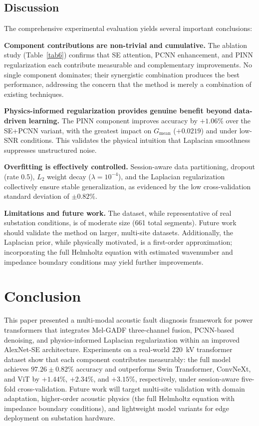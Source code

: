 \documentclass[twocolumn,iicol,pdflatex,sn-mathphys-num]{sn-jnl}%
\begin{document}
\subsection{Discussion}
The comprehensive experimental evaluation yields several important conclusions:

\textbf{Component contributions are non-trivial and cumulative.} The ablation study (Table~\ref{tab6}) confirms that SE attention, PCNN enhancement, and PINN regularization each contribute measurable and complementary improvements. No single component dominates; their synergistic combination produces the best performance, addressing the concern that the method is merely a combination of existing techniques.

\textbf{Physics-informed regularization provides genuine benefit beyond data-driven learning.} The PINN component improves accuracy by $+1.06\%$ over the SE+PCNN variant, with the greatest impact on $G_{\text{mean}}$ ($+0.0219$) and under low-SNR conditions. This validates the physical intuition that Laplacian smoothness suppresses unstructured noise.

\textbf{Overfitting is effectively controlled.} Session-aware data partitioning, dropout (rate 0.5), $L_2$ weight decay ($\lambda = 10^{-4}$), and the Laplacian regularization collectively ensure stable generalization, as evidenced by the low cross-validation standard deviation of $\pm 0.82\%$.

\textbf{Limitations and future work.} The dataset, while representative of real substation conditions, is of moderate size (661 total segments). Future work should validate the method on larger, multi-site datasets. Additionally, the Laplacian prior, while physically motivated, is a first-order approximation; incorporating the full Helmholtz equation with estimated wavenumber and impedance boundary conditions may yield further improvements.

\section{Conclusion}
\label{section6}
This paper presented a multi-modal acoustic fault diagnosis framework for power transformers that integrates Mel-GADF three-channel fusion, PCNN-based denoising, and physics-informed Laplacian regularization within an improved AlexNet-SE architecture. Experiments on a real-world 220~kV transformer dataset show that each component contributes measurably: the full model achieves $97.26 \pm 0.82\%$ accuracy and outperforms Swin Transformer, ConvNeXt, and ViT by $+1.44\%$, $+2.34\%$, and $+3.15\%$, respectively, under session-aware five-fold cross-validation. Future work will target multi-site validation with domain adaptation, higher-order acoustic physics (the full Helmholtz equation with impedance boundary conditions), and lightweight model variants for edge deployment on substation hardware.
\end{document}
